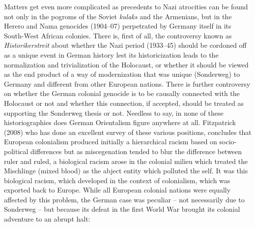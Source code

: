 Matters get even more complicated as precedents to Nazi atrocities can be found not only in the pogroms of the Soviet {\sl kulaks} and the Armenians, but in the Herero and Nama genocides (1904--07) perpetrated by Germany itself in its South-West African colonies. There is, first of all, the controversy known as {\sl Historikerstreit} about whether the Nazi period (1933--45) should be cordoned off as a unique event in German history lest its historicization leads to the normalization and trivialization of the Holocaust, or whether it should be viewed as the end product of a way of modernization that was unique (Sonderweg) to Germany and different from other European nations. There is further controversy on whether the German colonial genocide is to be causally connected with the Holocaust or not and whether this connection, if accepted, should be treated as supporting the Sonderweg thesis or not. Needless to say, in none of these historiographies does German Orientalism figure anywhere at all. Fitzpatrick (2008) who has done an excellent survey of these various positions, concludes that European colonialism produced initially a hierarchical racism based on socio-political differences but as miscegenation tended to blur the difference between ruler and ruled, a biological racism arose in the colonial milieu which treated the Mischlinge (mixed blood) as the abject entity which polluted the self. It was this biological racism, which developed in the context of colonialism, which was exported back to Europe. While all European colonial nations were equally affected by this problem, the German case was peculiar – not necessarily due to Sonderweg – but because its defeat in the first World War brought its colonial adventure to an abrupt halt:
\medskip


